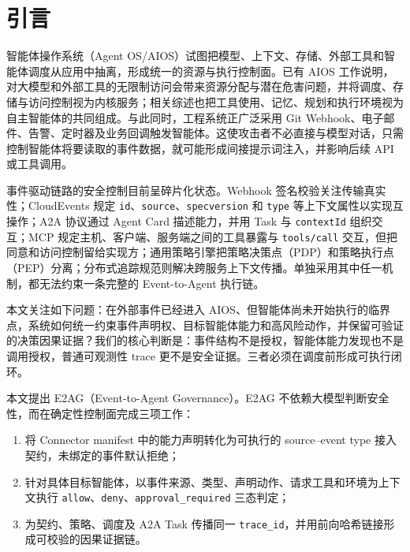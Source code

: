 \section{引言}\label{sec:introduction}

智能体操作系统（Agent OS/AIOS）试图把模型、上下文、存储、外部工具和智能体调度从应用中抽离，形成统一的资源与执行控制面。已有 AIOS 工作说明，对大模型和外部工具的无限制访问会带来资源分配与潜在危害问题，并将调度、存储与访问控制视为内核服务\cite{aios}；相关综述也把工具使用、记忆、规划和执行环境视为自主智能体的共同组成\cite{agent-survey}。与此同时，工程系统正广泛采用 Git Webhook、电子邮件、告警、定时器及业务回调触发智能体。这使攻击者不必直接与模型对话，只需控制智能体将要读取的事件数据，就可能形成间接提示词注入，并影响后续 API 或工具调用\cite{indirect-pi,injecagent,agentdojo}。

事件驱动链路的安全控制目前呈碎片化状态。Webhook 签名校验关注传输真实性；CloudEvents 规定 \texttt{id}、\texttt{source}、\texttt{specversion} 和 \texttt{type} 等上下文属性以实现互操作\cite{cloudevents}；A2A 协议通过 Agent Card 描述能力，并用 Task 与 \texttt{contextId} 组织交互\cite{a2a}；MCP 规定主机、客户端、服务端之间的工具暴露与 \texttt{tools/call} 交互，但把同意和访问控制留给实现方\cite{mcp}；通用策略引擎把策略决策点（PDP）和策略执行点（PEP）分离\cite{opa}；分布式追踪规范则解决跨服务上下文传播\cite{trace-context}。单独采用其中任一机制，都无法约束一条完整的 Event-to-Agent 执行链。

本文关注如下问题：在外部事件已经进入 AIOS、但智能体尚未开始执行的临界点，系统如何统一约束事件声明权、目标智能体能力和高风险动作，并保留可验证的决策因果证据？我们的核心判断是：事件结构不是授权，智能体能力发现也不是调用授权，普通可观测性 trace 更不是安全证据。三者必须在调度前形成可执行闭环。

本文提出 E2AG（Event-to-Agent Governance）。E2AG 不依赖大模型判断安全性，而在确定性控制面完成三项工作：

\begin{enumerate}
\def\labelenumi{\arabic{enumi}.}
\tightlist
\item
  将 Connector manifest 中的能力声明转化为可执行的 source--event type 接入契约，未绑定的事件默认拒绝；
\item
  针对具体目标智能体，以事件来源、类型、声明动作、请求工具和环境为上下文执行 \texttt{allow}、\texttt{deny}、\texttt{approval\_required} 三态判定；
\item
  为契约、策略、调度及 A2A Task 传播同一 \texttt{trace\_id}，并用前向哈希链接形成可校验的因果证据链。
\end{enumerate}

